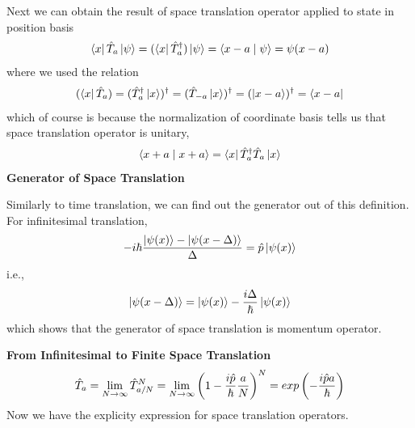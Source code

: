 \documentclass[letterpaper,10pt,english]{sphinxmanual}
\newcommand{\bra}[1]{\left\langle #1\right|}
\newcommand{\ket}[1]{\left| #1\right\rangle}
\newcommand{\braket}[2]{\langle #1 \mid #2 \rangle}
\begin{document}
Next we can obtain the result of space translation operator applied to state in position basis
\begin{gather}
\begin{split}\bra{x}\hat T_a \ket{\psi} = (\bra{x}\hat T_a^\dagger) \ket{\psi} = \braket{x-a}{\psi} = \psi(x-a)\end{split}\notag
\end{gather}
where we used the relation
\begin{gather}
\begin{split}(\bra{x} \hat T_a) =  (\hat T_a^\dagger \ket{x} )^\dagger = (\hat T _ {-a} \ket{x}  )^\dagger = (\ket{x-a})^\dagger = \bra{x-a}\end{split}\notag
\end{gather}
which of course is because the normalization of coordinate basis tells us that space translation operator is unitary,
\begin{gather}
\begin{split}\braket{x+a}{x+a} = \bra{x}\hat T_a^\dagger \hat T_a \ket{x}\end{split}\notag
\end{gather}
\textbf{Generator of Space Translation}

Similarly to time translation, we can find out the generator out of this definition. For infinitesimal translation,
\begin{gather}
\begin{split}-i\hbar \frac{\ket{\psi(x)} - \ket{\psi(x - \Delta)}}{\Delta} = \hat p \ket{\psi(x)}\end{split}\notag
\end{gather}
i.e.,
\begin{gather}
\begin{split}\ket{\psi(x-\Delta)} = \ket{\psi(x)} - \frac{i\Delta}{\hbar} \ket{\psi(x)}\end{split}\notag
\end{gather}
which shows that the generator of space translation is momentum operator.

\textbf{From Infinitesimal to Finite Space Translation}
\begin{gather}
\begin{split}\hat T_a = \lim _ {N\rightarrow \infty} \hat T _ {a/N} ^ N = \lim _{N\rightarrow\infty} \left( 1 - \frac{i\hat p}{\hbar} \frac{a}{N} \right)^N = exp\left( -\frac{i \hat p a}{\hbar} \right)\end{split}\notag
\end{gather}
Now we have the explicity expression for space translation operators.
\end{document}
